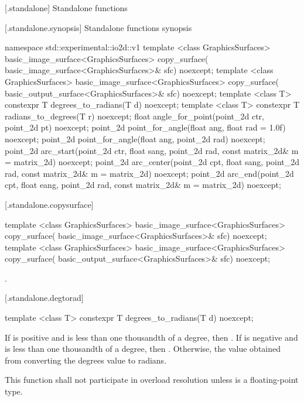  [\iotwod.standalone] {Standalone functions}

 [\iotwod.standalone.synopsis] {Standalone functions synopsis}

\begin{codeblock}
namespace std::experimental::io2d::v1 {
  template <class GraphicsSurfaces>
  basic_image_surface<GraphicsSurfaces> copy_surface(
    basic_image_surface<GraphicsSurfaces>& sfc) noexcept;
  template <class GraphicsSurfaces>
  basic_image_surface<GraphicsSurfaces> copy_surface(
    basic_output_surface<GraphicsSurfaces>& sfc) noexcept;
  template <class T>
  constexpr T degrees_to_radians(T d) noexcept;
  template <class T>
  constexpr T radians_to_degrees(T r) noexcept;
  float angle_for_point(point_2d ctr, point_2d pt) noexcept;
  point_2d point_for_angle(float ang, float rad = 1.0f) noexcept;
  point_2d point_for_angle(float ang, point_2d rad) noexcept;
  point_2d arc_start(point_2d ctr, float sang, point_2d rad, 
    const matrix_2d& m = matrix_2d{}) noexcept;
  point_2d arc_center(point_2d cpt, float sang, point_2d rad, 
    const matrix_2d& m = matrix_2d{}) noexcept;
  point_2d arc_end(point_2d cpt, float eang, point_2d rad, 
    const matrix_2d& m = matrix_2d{}) noexcept;
}
\end{codeblock}

 [\iotwod.standalone.copysurface] {}

%
\begin{itemdecl}
template <class GraphicsSurfaces>
basic_image_surface<GraphicsSurfaces> copy_surface(
  basic_image_surface<GraphicsSurfaces>& sfc) noexcept;
template <class GraphicsSurfaces>
basic_image_surface<GraphicsSurfaces> copy_surface(
  basic_output_surface<GraphicsSurfaces>& sfc) noexcept;
\end{itemdecl}
\begin{itemdescr}
\pnum
\returns
{}.
\end{itemdescr}

 [\iotwod.standalone.degtorad] {}
\begin{itemdecl}
template <class T>
constexpr T degrees_to_radians(T d) noexcept;
\end{itemdecl}
\begin{itemdescr}
\returns
If  is positive and is less than one thousandth of a degree, then . If  is negative and is less than one thousandth of a degree, then . Otherwise, the value obtained from converting the degrees value  to radians.

\remarks
This function shall not participate in overload resolution unless  is a floating-point type.
\end{itemdescr}


